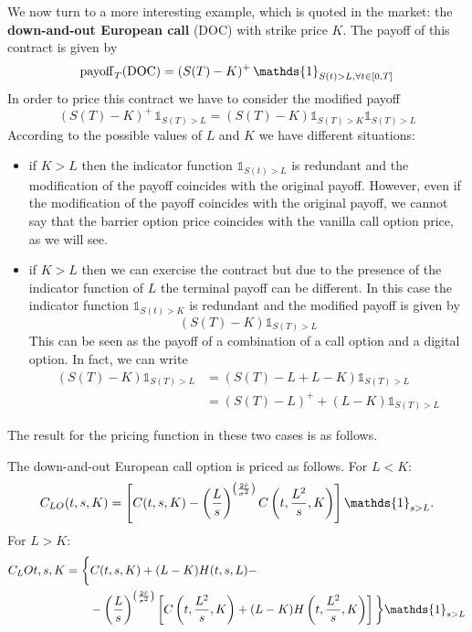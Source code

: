 We now turn to a more interesting example, which is quoted in the market: the \textbf{down-and-out European call} (DOC) with strike price $K$. The payoff of this contract is given by
\begin{equation}
  \pay_T(\text{DOC}) = (S(T)-K)^+\,\mathds{1}_{S(t)>L,\forall t\in[0,T]}
\end{equation}
In order to price this contract we have to consider the modified payoff
\begin{equation}
  (S(T)-K)^+\,\mathds{1}_{S(T)>L} = (S(T)-K)\mathds{1}_{S(T)>K}\mathds{1}_{S(T)>L}
\end{equation}
According to the possible values of $L$ and $K$ we have different situations:
\begin{itemize}
  \item if $K>L$ then the indicator function $\mathds{1}_{S(t)>L}$ is redundant and the modification of the payoff coincides with the original payoff. However, even if the modification of the payoff coincides with the original payoff, we cannot say that the barrier option price coincides with the vanilla call option price, as we will see.
  \item if $K>L$ then we can exercise the contract but due to the presence of the indicator function of $L$ the terminal payoff can be different. In this case the indicator function $\mathds{1}_{S(t)>K}$ is redundant and the modified payoff is given by
  \begin{equation*}
    (S(T)-K)\mathds{1}_{S(T)>L}
  \end{equation*}
  This can be seen as the payoff of a combination of a call option and a digital option. In fact, we can write
  \begin{align*}
    (S(T)-K)\mathds{1}_{S(T)>L} &= (S(T)-L+L-K)\mathds{1}_{S(T)>L} \\
    &=
    (S(T)-L)^+ + (L-K)\mathds{1}_{S(T)>L}
  \end{align*}
\end{itemize}
The result for the pricing function in these two cases is as follows.
\begin{proposition}
  The down-and-out European call option is priced as follows. For $L<K$:
  \begin{equation}\label{clo}
    C_{LO}(t,s,K) = \left[C(t,s,K)-\left(\frac{L}{s}\right)^{\left(\frac{2\Tilde{r}}{\sigma^2}\right)} C\left(t,\frac{L^2}{s},K\right)\right]\mathds{1}_{s>L}.
  \end{equation}
  For $L>K$:
  \begin{align}
      \notag C_LO{t,s,K} &= \bigg\{C(t,s,K) + (L-K)H(t,s,L) - \\
      &\qquad
      - \left(\frac{L}{s}\right)^{\left(\frac{2\Tilde{r}}{\sigma^2}\right)}
      \left[C\left(t,\frac{L^2}{s},K\right) + (L-K)H\left(t,\frac{L^2}{s},K\right)\right]\bigg\}\mathds{1}_{s>L}
  \end{align}
\end{proposition}
